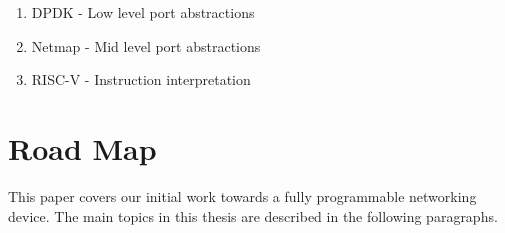 \begin{enumerate}
  \item DPDK - Low level port abstractions
  \item Netmap - Mid level port abstractions
  \item RISC-V - Instruction interpretation
\end{enumerate}

%
%

\section{Road Map}
\label{intro:map}
This paper covers our initial work towards a fully programmable networking
device. The main topics in this thesis are described in the following
paragraphs.

